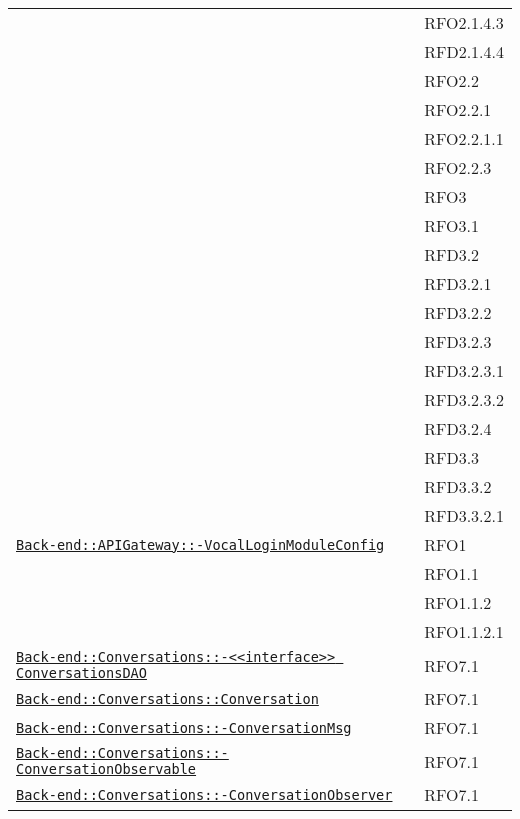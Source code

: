 \begin{longtable}{|>{\centering}m{10cm}|m{3cm}<{\centering}|}
& RFO2.1.4.3\\
& RFD2.1.4.4\\
& RFO2.2\\
& RFO2.2.1\\
& RFO2.2.1.1\\
& RFO2.2.3\\
& RFO3\\
& RFO3.1\\
& RFD3.2\\
& RFD3.2.1\\
& RFD3.2.2\\
& RFD3.2.3\\
& RFD3.2.3.1\\
& RFD3.2.3.2\\
& RFD3.2.4\\
& RFD3.3\\
& RFD3.3.2\\
& RFD3.3.2.1\\ \hline

\hyperref[Back-end::APIGateway::VocalLoginModuleConfig]{\texttt{Back-end::APIGateway::-\linebreak VocalLoginModuleConfig}} & RFO1\\
& RFO1.1\\
& RFO1.1.2\\
& RFO1.1.2.1\\ \hline

\hyperref[Back-end::Conversations::<<interface>> ConversationsDAO]{\texttt{Back-end::Conversations::-\linebreak <<interface>> ConversationsDAO}} & RFO7.1\\ \hline

\hyperref[Back-end::Conversations::Conversation]{\texttt{Back-end::Conversations::Conversation}} & RFO7.1\\ \hline

\hyperref[Back-end::Conversations::ConversationMsg]{\texttt{Back-end::Conversations::-\linebreak ConversationMsg}} & RFO7.1\\ \hline

\hyperref[Back-end::Conversations::ConversationObservable]{\texttt{Back-end::Conversations::-\linebreak ConversationObservable}} & RFO7.1\\ \hline

\hyperref[Back-end::Conversations::ConversationObserver]{\texttt{Back-end::Conversations::-\linebreak ConversationObserver}} & RFO7.1\\ \hline


\end{longtable}
